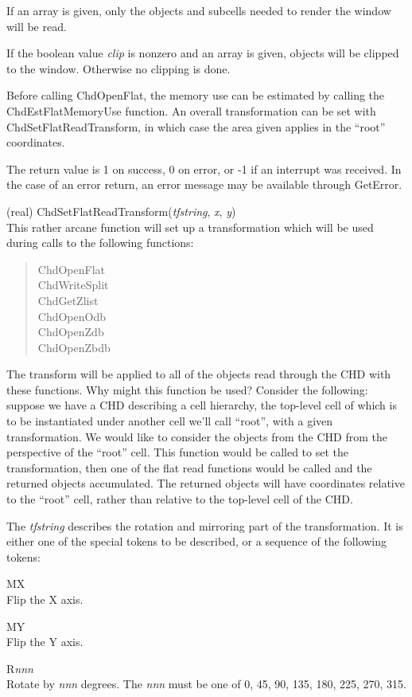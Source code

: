 \begin{description}
If an array is given, only the objects and subcells needed to render
the window will be read.

If the boolean value {\it clip} is nonzero and an array is given,
objects will be clipped to the window.  Otherwise no clipping is done.

Before calling {\vt ChdOpenFlat}, the memory use can be estimated by
calling the {\vt ChdEstFlatMemoryUse} function.  An overall
transformation can be set with {\vt ChdSetFlatReadTransform}, in which
case the area given applies in the ``root'' coordinates.

The return value is 1 on success, 0 on error, or -1 if an interrupt
was received.  In the case of an error return, an error message may be
available through {\vt GetError}.

\item{(real) \vt ChdSetFlatReadTransform({\it tfstring\/}, {\it x\/},
 {\it y\/})}\\
This rather arcane function will set up a transformation which will be
used during calls to the following functions:
\begin{quote} \vt
ChdOpenFlat\\
ChdWriteSplit\\
ChdGetZlist\\
ChdOpenOdb\\
ChdOpenZdb\\
ChdOpenZbdb
\end{quote}

The transform will be applied to all of the objects read through the
CHD with these functions.  Why might this function be used?  Consider
the following:  suppose we have a CHD describing a cell hierarchy, the
top-level cell of which is to be instantiated under another cell we'll
call ``root'', with a given transformation.  We would like to consider
the objects from the CHD from the perspective of the ``root'' cell. 
This function would be called to set the transformation, then one of
the flat read functions would be called and the returned objects
accumulated.  The returned objects will have coordinates relative to
the ``root'' cell, rather than relative to the top-level cell of the
CHD.

The {\it tfstring} describes the rotation and mirroring part of the
transformation.  It is either one of the special tokens to be
described, or a sequence of the following tokens:

\begin{description}
\item{\vt MX}\\
 Flip the X axis.
\item{\vt MY}\\
 Flip the Y axis.
\item{\vt R}{\it nnn}\\
 Rotate by {\it nnn} degrees.  The {\it nnn} must be one of 0, 45, 90,
 135, 180, 225, 270, 315.
\end{description}


\end{description}
